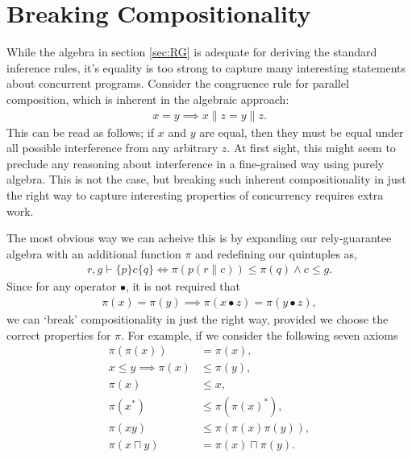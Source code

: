 \documentclass{llncs}
\begin{document}

\section{Breaking Compositionality}
\label{sec:INT}

While the algebra in section \ref{sec:RG} is adequate for deriving the
standard inference rules, it's equality is too strong to capture many
interesting statements about concurrent programs. Consider the
congruence rule for parallel composition, which is inherent in the
algebraic approach:
\begin{align*}
x = y \implies x\|z = y\|z.
\end{align*}
This can be read as follows; if $x$ and $y$ are equal, then they must
be equal under all possible interference from any arbitrary $z$. At
first sight, this might seem to preclude any reasoning about
interference in a fine-grained way using purely algebra. This is not
the case, but breaking such inherent compositionality in just the
right way to capture interesting properties of concurrency requires
extra work.

The most obvious way we can acheive this is by expanding our
rely-guarantee algebra with an additional function $\pi$ and redefining
our quintuples as,
\begin{align*}
r, g \vdash \{p\} c \{q\} \iff \pi(p(r\|c)) \le \pi(q) \land c \le g.
\end{align*}
Since for any operator $\bullet$, it is not required that
\begin{align*}
\pi(x) = \pi(y) \implies \pi(x \bullet z) = \pi(y \bullet z),
\end{align*}
we can `break' compositionality in just the right way, provided we
choose the correct properties for $\pi$. For example, if we consider
the following seven axioms
\begin{align}
\pi(\pi(x)) &= \pi(x), \label{pi1}\\
x \le y \implies \pi(x) &\le \pi(y), \label{pi2}\\
\pi(x) &\le x, \label{pi3}\\
\pi(x^*) &\le \pi(\pi(x)^*), \label{pi4}\\
\pi(xy) &\le \pi(\pi(x)\pi(y)), \label{pi5}\\
\pi(x \sqcap y) &= \pi(x) \sqcap \pi(y). \label{pi6}
\end{align}
\end{document}
